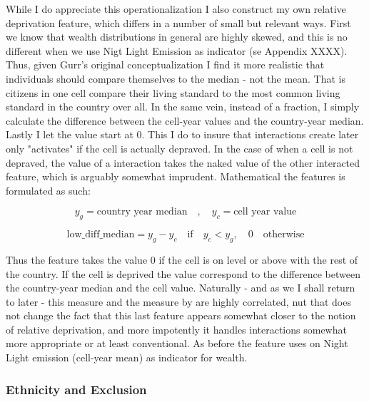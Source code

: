 \documentclass[a4paper]{article}
\begin{document}
While I do appreciate this operationalization I also construct my own relative deprivation feature, which differs in a number of small but relevant ways. First we know that wealth distributions in general are highly skewed, and this is no different when we use Nigt Light Emission as indicator (se Appendix XXXX). Thus, given Gurr's original conceptualization I find it more realistic that individuals should compare themselves to the median - not the mean. That is citizens in one cell compare their living standard to the most common living standard in the country over all. In the same vein, instead of a fraction, I simply calculate the difference between the cell-year values and the country-year median. Lastly I let the value start at 0. This I do to insure that interactions create later only "activates" if the cell is actually depraved. In the case of \cite{Cederman_Gleditsch_Buhaug_2013} when a cell is not depraved, the value of a interaction takes the naked value of the other interacted feature, which is arguably somewhat imprudent. Mathematical the features is formulated as such:\par

$$y_g = \textrm{country year median}\quad ,\quad  y_c = \textrm{cell year value}$$

$$\textrm{low\_diff\_median} = y_g - y_c  \quad \textrm{if} \quad y_c < y_g, \quad 0 \quad \textrm{otherwise}$$

Thus the feature takes the value 0 if the cell is on level or above with the rest of the country. If the cell is deprived the value correspond to the difference between the country-year median and the cell value. Naturally - and as we I shall return to later - this measure and the measure by \cite{Cederman_Weidmann_Gleditsch_2011} are highly correlated, nut that does not change the fact that this last feature appears somewhat closer to the notion of relative deprivation, and more impotently it handles interactions somewhat more appropriate or at least conventional. As before the feature uses on Night Light emission (cell-year mean) as indicator for wealth.\par

\subsubsection{Ethnicity and Exclusion}


\end{document}
